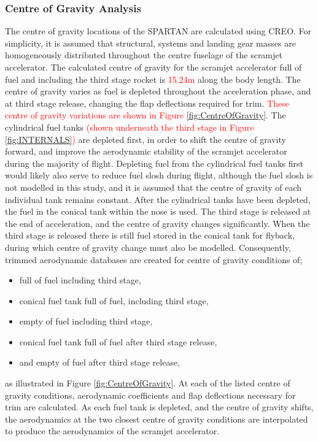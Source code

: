 		
		
		
		
		
		
		\subsubsection{Centre of Gravity Analysis}
		The centre of gravity locations of the SPARTAN are calculated using CREO. For simplicity, it is assumed that structural, systems and landing gear masses are homogeneously distributed throughout the centre fuselage of the scramjet accelerator. 
		The calculated centre of gravity for the scramjet accelerator full of fuel and including the third stage rocket is \textcolor{red}{15.24m} along the body length. The centre of gravity varies as fuel is depleted throughout the acceleration phase, and at third stage release, changing the flap deflections required for trim. \textcolor{red}{These centre of gravity variations are shown in Figure \ref{fig:CentreOfGravity}}. The cylindrical fuel tanks \textcolor{red}{(shown underneath the third stage in Figure \ref{fig:INTERNALS})} are depleted first, in order to shift the centre of gravity forward, and improve the aerodynamic stability of the scramjet accelerator during the majority of flight. Depleting fuel from the cylindrical fuel tanks first would likely also serve to reduce fuel slosh during flight, although the fuel slosh is not modelled in this study, and it is assumed that the centre of gravity of each individual tank remains constant. After the cylindrical tanks have been depleted, the fuel in the conical tank within the nose is used. The third stage is released at the end of acceleration, and the centre of gravity changes significantly. When the third stage is released there is still fuel stored in the conical tank for flyback, during which centre of gravity change must also be modelled. 
		Consequently, trimmed aerodynamic databases are created for centre of gravity conditions of; 
		\begin{itemize}
			\item full of fuel including third stage,
			\item conical fuel tank full of fuel, including third stage,
			\item empty of fuel including third stage,
			\item conical fuel tank full of fuel after third stage release,
			\item and empty of fuel after third stage release,
		\end{itemize}
		 as illustrated in Figure \ref{fig:CentreOfGravity}. At each of the listed centre of gravity conditions, aerodynamic coefficients and flap deflections necessary for trim are calculated.  As each fuel tank is depleted, and the centre of gravity shifts, the aerodynamics at the two closest centre of gravity conditions are interpolated to produce the aerodynamics of the scramjet accelerator.  
		
